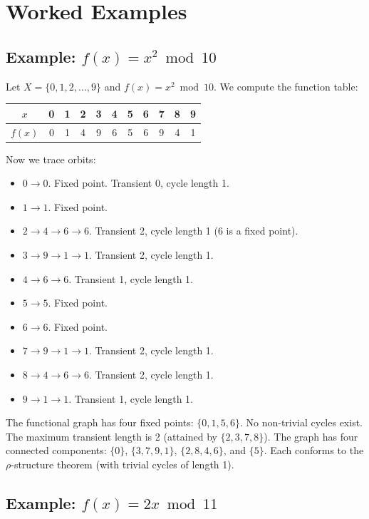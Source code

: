 \section{Worked Examples}

\subsection*{Example: $f(x) = x^2 \bmod 10$}

Let $X = \{ 0, 1, 2, \ldots, 9\} $ and $f(x) = x^2 \bmod 10$. We compute the function table:

\begin{center}
\begin{tabular}{ccccccccccc}
\toprule
$x$ & 0 & 1 & 2 & 3 & 4 & 5 & 6 & 7 & 8 & 9 \\
\midrule
$f(x)$ & 0 & 1 & 4 & 9 & 6 & 5 & 6 & 9 & 4 & 1 \\
\bottomrule
\end{tabular}
\end{center}

Now we trace orbits:
\begin{itemize}
\item $0 \to 0$. Fixed point. Transient 0, cycle length 1.
\item $1 \to 1$. Fixed point.
\item $2 \to 4 \to 6 \to 6$. Transient 2, cycle length 1 (6 is a fixed point).
\item $3 \to 9 \to 1 \to 1$. Transient 2, cycle length 1.
\item $4 \to 6 \to 6$. Transient 1, cycle length 1.
\item $5 \to 5$. Fixed point.
\item $6 \to 6$. Fixed point.
\item $7 \to 9 \to 1 \to 1$. Transient 2, cycle length 1.
\item $8 \to 4 \to 6 \to 6$. Transient 2, cycle length 1.
\item $9 \to 1 \to 1$. Transient 1, cycle length 1.
\end{itemize}

The functional graph has four fixed points: $\{ 0, 1, 5, 6\} $. No non-trivial cycles exist. The maximum transient length is 2 (attained by $\{ 2, 3, 7, 8\} $). The graph has four connected components: $\{ 0\} $, $\{ 3, 7, 9, 1\} $, $\{ 2, 8, 4, 6\} $, and $\{ 5\} $. Each conforms to the $\rho$-structure theorem (with trivial cycles of length 1).

\subsection*{Example: $f(x) = 2x \bmod 11$}


